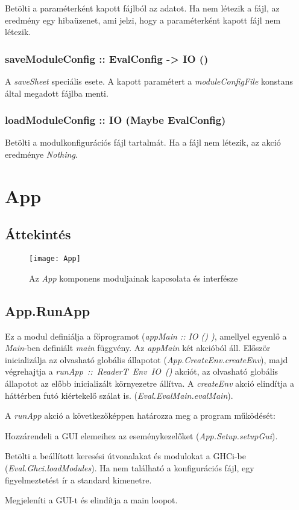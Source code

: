 Betölti a paraméterként kapott fájlból az adatot. Ha nem létezik a fájl, az eredmény egy hibaüzenet, ami jelzi, hogy a paraméterként kapott fájl nem létezik.

\subsubsection{saveModuleConfig :: EvalConfig -> IO ()}

A \textit{saveSheet} speciális esete. A kapott paramétert a \textit{moduleConfigFile} konstans által megadott fájlba menti.

\subsubsection{loadModuleConfig :: IO (Maybe EvalConfig)}

Betölti a modulkonfigurációs fájl tartalmát. Ha a fájl nem létezik, az akció eredménye \textit{Nothing}.

\section{App}

\subsection{Áttekintés}

\begin{figure}[H]
	\centering
	\texttt{[image: App]}
	\caption{Az \textit{App} komponens moduljainak kapcsolata és interfésze}
	\label{fig:appstructure}
\end{figure}

\subsection{App.RunApp}

Ez a modul definiálja a főprogramot (\textit{appMain :: IO () )}, amellyel egyenlő a \textit{Main}-ben definiált \textit{main} függvény. Az \textit{appMain} két akcióból áll. Először inicializálja az olvasható globális állapotot (\textit{App.CreateEnv.createEnv}), majd végrehajtja a \mbox{\textit{runApp :: ReaderT Env IO ()}} akciót, az olvasható globális állapotot az előbb inicializált környezetre állítva. A 
\textit{createEnv} akció elindítja a háttérben futó kiértekelő szálat is. (\textit{Eval.EvalMain.evalMain}).

A \textit{runApp} akció a következőképpen határozza meg a program működését:
\begin{compactenum}
	\item Hozzárendeli a GUI elemeihez az eseménykezelőket (\textit{App.Setup.setupGui}).
	\item Betölti a beállított keresési útvonalakat és modulokat a GHCi-be (\textit{Eval.Ghci.loadModules}). Ha nem található a konfigurációs fájl, egy figyelmeztetést ír a standard kimenetre.
	\item Megjeleníti a GUI-t és elindítja a main loopot. 
\end{compactenum}


